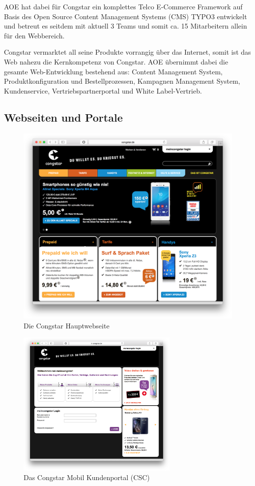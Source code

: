 \documentclass[11pt,a4paper]{article}
\begin{document}
AOE hat dabei für Congstar ein komplettes Telco E-Commerce Framework auf Basis des Open Source Content Management Systems (CMS) TYPO3 entwickelt und betreut es seitdem mit aktuell 3 Teams und somit ca. 15 Mitarbeitern allein für den Webbereich.

Congstar vermarktet all seine Produkte vorrangig über das Internet, somit ist das Web nahezu die Kernkompetenz von Congstar. AOE übernimmt dabei die gesamte Web-Entwicklung bestehend aus: Content Management System, Produktkonfiguration und Bestellprozessen, Kampagnen Management System, Kundenservice, Vertriebspartnerportal und White Label-Vertrieb. 

\subsection{Webseiten und Portale}

\begin{figure}[H]
\includegraphics[width=\textwidth]{images/Sites/Congstar_Main.png}
\centering
\caption{Die Congstar Hauptwebseite \cite{congstar}}
\end{figure}

\begin{figure}[H]
\includegraphics[width=0.7\textwidth]{images/Sites/Congstar_Mobil_CSC.png}
\centering
\caption{Das Congstar Mobil Kundenportal (CSC)\cite{congstarcsc}}
\end{figure}
\end{document}
